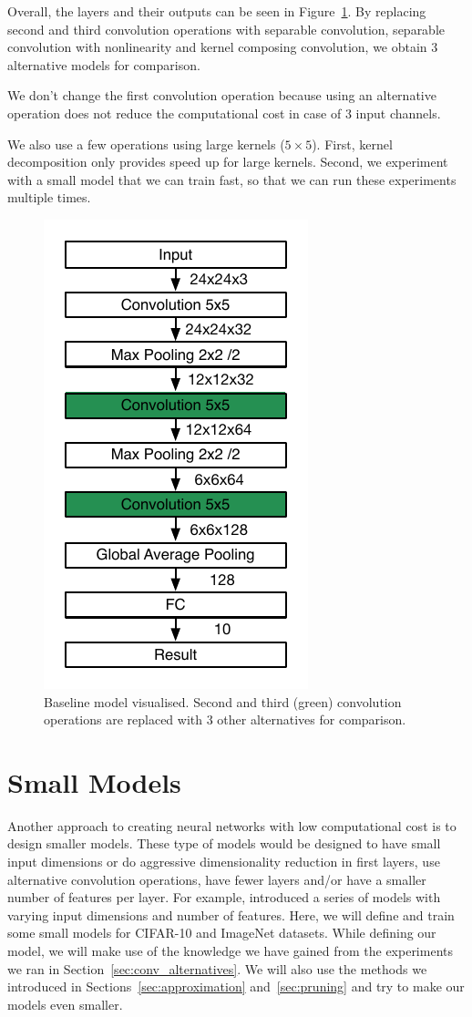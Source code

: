 Overall, the layers and their outputs can be seen in Figure~\ref{fig:baseline_model}. By replacing second and third convolution operations with separable convolution, separable convolution with nonlinearity and kernel composing convolution, we obtain 3 alternative models for comparison.

We don't change the first convolution operation because using an alternative operation does not reduce the computational cost in case of $3$ input channels.

We also use a few operations using large kernels ($5\times 5$). First, kernel decomposition only provides speed up for large kernels. Second, we experiment with a small model that we can train fast, so that we can run these experiments multiple times.
\begin{figure}[!h]
  \begin{centering}
    \includegraphics[width=.3\textwidth]{images/baseline_model.pdf}
    \caption{Baseline model visualised. Second and third (green) convolution operations are replaced with 3 other alternatives for comparison.}
    \label{fig:baseline_model}
  \end{centering}
\end{figure}

\section{Small Models}
\label{sec:small_models}
Another approach to creating neural networks with low computational cost is to design smaller models. These type of models would be designed to have small input dimensions or do aggressive dimensionality reduction in first layers, use alternative convolution operations, have fewer layers and/or have a smaller number of features per layer. For example, \cite{howard2017mobilenets} introduced a series of models with varying input dimensions and number of features. Here, we will define and train some small models for CIFAR-10 and ImageNet datasets. While defining our model, we will make use of the knowledge we have gained from the experiments we ran in Section~\ref{sec:conv_alternatives}. We will also use the methods we introduced in Sections~\ref{sec:approximation} and~\ref{sec:pruning} and try to make our models even smaller.

